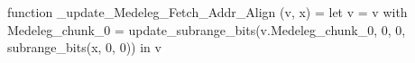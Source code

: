 function _update_Medeleg_Fetch_Addr_Align (v, x) = let v = { v with Medeleg_chunk_0 = update_subrange_bits(v.Medeleg_chunk_0, 0, 0, subrange_bits(x, 0, 0)) } in
  v
